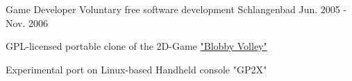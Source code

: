 \begin{cventries}
    \cventry
    {Game Developer} %
    {Voluntary free software development} %
    {Schlangenbad} %
    {Jun. 2005 - Nov. 2006} %
    {
      \begin{cvitems} %
        \item {GPL-licensed portable clone of the 2D-Game \href{https://de.wikipedia.org/wiki/Blobby_Volley\#Blobby_Volley_2}{"Blobby Volley"} \acvHeaderIconSep \faWikipediaW}
        \item {Experimental port on Linux-based Handheld console "GP2X"}
      \end{cvitems}
    }

\end{cventries}
